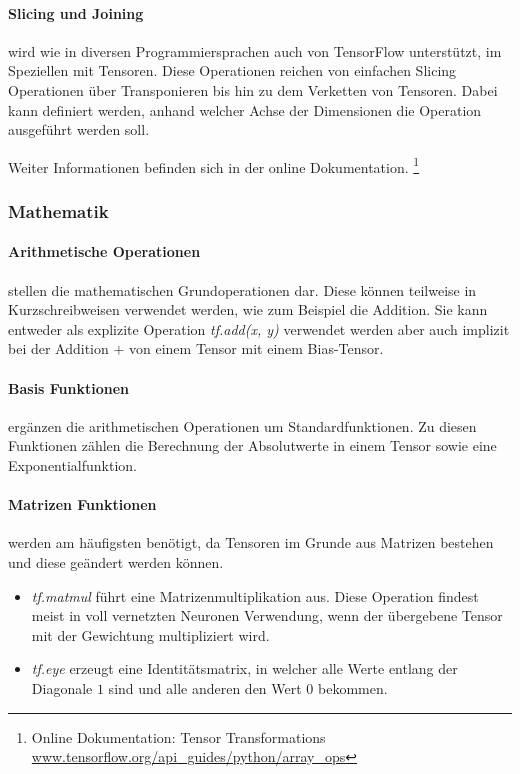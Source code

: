 \paragraph{Slicing und Joining} wird wie in diversen Programmiersprachen auch von TensorFlow unterstützt, im Speziellen mit Tensoren. 
Diese Operationen reichen von einfachen Slicing Operationen über Transponieren bis hin zu dem Verketten von Tensoren. 
Dabei kann definiert werden, anhand welcher Achse der Dimensionen die Operation ausgeführt werden soll.  
\phantom \newline

\noindent
Weiter Informationen befinden sich in der online Dokumentation. \footnote{Online Dokumentation: Tensor Transformations \url{www.tensorflow.org/api_guides/python/array_ops}}

\subsubsection{Mathematik} 

\paragraph{Arithmetische Operationen} stellen die mathematischen Grundoperationen dar. 
Diese können teilweise in Kurzschreibweisen verwendet werden, wie zum Beispiel die Addition. 
Sie kann entweder als explizite Operation \textit{tf.add(x, y)} verwendet werden aber auch implizit bei der Addition $+$ von einem Tensor mit einem Bias-Tensor.

\paragraph{Basis Funktionen} ergänzen die arithmetischen Operationen um Standardfunktionen. 
Zu diesen Funktionen zählen die Berechnung der Absolutwerte in einem Tensor sowie eine Exponentialfunktion. 

\paragraph{Matrizen Funktionen} werden am häufigsten benötigt, da Tensoren im Grunde aus Matrizen bestehen und  diese geändert werden können. 
\begin{itemize}
	\item \textit{tf.matmul} führt eine Matrizenmultiplikation aus. 
	Diese Operation findest meist in voll vernetzten Neuronen Verwendung, wenn der übergebene Tensor mit der Gewichtung multipliziert wird. 
	\item \textit{tf.eye} erzeugt eine Identitätsmatrix, in welcher alle Werte entlang der Diagonale $1$ sind und alle anderen den Wert $0$ bekommen. 
\end{itemize}


